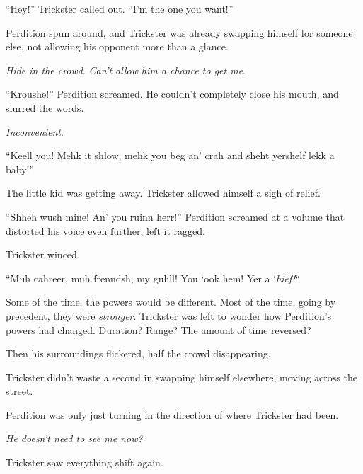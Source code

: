 ``Hey!''  Trickster called out.  ``I'm the one you want!''



Perdition spun around, and Trickster was already swapping himself for someone else, not allowing his opponent more than a glance.



\emph{Hide in the crowd}.  \emph{Can't allow him a chance to get me}.



``Kroushe!''  Perdition screamed.  He couldn't completely close his mouth, and slurred the words.



\emph{Inconvenient}.



``Keell you!  Mehk it shlow, mehk you beg an' crah and sheht yershelf lekk a baby!''



The little kid was getting away.  Trickster allowed himself a sigh of relief.



``Shheh wush mine!  An' you ruinn herr!''  Perdition screamed at a volume that distorted his voice even further, left it ragged.



Trickster winced.



``Muh cahreer, muh frenndsh, my guhll!  You `ook hem!  Yer a `\emph{hief!}``



Some of the time, the powers would be different.  Most of the time, going by precedent, they were \emph{stronger}.  Trickster was left to wonder how Perdition's powers had changed.  Duration?  Range?  The amount of time reversed?



Then his surroundings flickered, half the crowd disappearing.



Trickster didn't waste a second in swapping himself elsewhere, moving across the street.



Perdition was only just turning in the direction of where Trickster had been.



\emph{He doesn't need to see me now?}



Trickster saw everything shift again.



